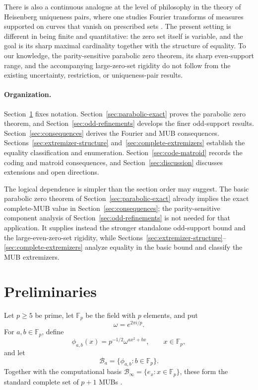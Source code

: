 \documentclass[11pt]{article}
\newcommand{\F}{\mathbb F}
\begin{document}
There is also a continuous analogue at the level of philosophy in the theory
of Heisenberg uniqueness pairs, where one studies Fourier transforms of
measures supported on curves that vanish on prescribed sets
\cite{HedenmalmMontes,GiriSrivastava}.  The present setting is different in
being finite and quantitative: the zero set itself is variable, and the goal
is its sharp maximal cardinality together with the structure of equality.
To our knowledge, the parity-sensitive parabolic zero theorem, its sharp
even-support range, and the accompanying large-zero-set rigidity do not
follow from the existing uncertainty, restriction, or uniqueness-pair
results.

\paragraph{Organization.}
Section~\ref{sec:setup} fixes notation.  Section~\ref{sec:parabolic-exact}
proves the parabolic zero theorem, and Section~\ref{sec:odd-refinements}
develops the finer odd-support results.  Section~\ref{sec:consequences}
derives the Fourier and MUB consequences.  Sections~\ref{sec:extremizer-structure}
and~\ref{sec:complete-extremizers} establish the equality classification and
enumeration.  Section~\ref{sec:code-matroid} records the coding and matroid
consequences, and Section~\ref{sec:discussion} discusses extensions and open
directions.

The logical dependence is simpler than the section order may suggest.  The
basic parabolic zero theorem of Section~\ref{sec:parabolic-exact} already
implies the exact complete-MUB value in Section~\ref{sec:consequences}; the
parity-sensitive component analysis of Section~\ref{sec:odd-refinements} is
not needed for that application.  It supplies instead the stronger standalone
odd-support bound and the large-even-zero-set rigidity, while
Sections~\ref{sec:extremizer-structure}--\ref{sec:complete-extremizers} analyze
equality in the basic bound and classify the MUB extremizers.

\section{Preliminaries}
\label{sec:setup}

Let $p\ge5$ be prime, let $\F_p$ be the field with $p$ elements, and put
\[
 \omega=e^{2\pi i/p}.
\]
For $a,b\in\F_p$, define
\begin{equation}
 \phi_{a,b}(x)
 =p^{-1/2}\omega^{ax^2+bx},
 \qquad x\in\F_p,
 \label{eq:standard-MUB}
\end{equation}
and let
\[
 \mathcal B_a=\{\phi_{a,b}:b\in\F_p\}.
\]
Together with the computational basis
$\mathcal B_\infty=\{e_x:x\in\F_p\}$, these form the standard complete set
of $p+1$ MUBs \cite{WF}.
\end{document}
